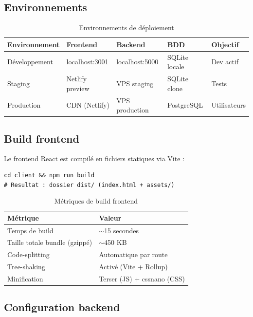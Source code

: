 \subsection{Environnements}

\begin{table}[H]
\centering
\caption{Environnements de déploiement}
\label{tab:environments}
\begin{tabular}{|l|l|l|l|l|}
\hline
\textbf{Environnement} & \textbf{Frontend} & \textbf{Backend} & \textbf{BDD} & \textbf{Objectif} \\
\hline
Développement & localhost:3001 & localhost:5000 & SQLite locale & Dev actif \\
\hline
Staging & Netlify preview & VPS staging & SQLite clone & Tests \\
\hline
Production & CDN (Netlify) & VPS production & PostgreSQL & Utilisateurs \\
\hline
\end{tabular}
\end{table}

\subsection{Build frontend}

Le frontend React est compilé en fichiers statiques via Vite :

\begin{verbatim}
cd client && npm run build
# Resultat : dossier dist/ (index.html + assets/)
\end{verbatim}

\begin{table}[H]
\centering
\caption{Métriques de build frontend}
\label{tab:build-metrics}
\begin{tabular}{|l|l|}
\hline
\textbf{Métrique} & \textbf{Valeur} \\
\hline
Temps de build & $\sim$15 secondes \\
\hline
Taille totale bundle (gzippé) & $\sim$450 KB \\
\hline
Code-splitting & Automatique par route \\
\hline
Tree-shaking & Activé (Vite + Rollup) \\
\hline
Minification & Terser (JS) + cssnano (CSS) \\
\hline
\end{tabular}
\end{table}

\subsection{Configuration backend}

